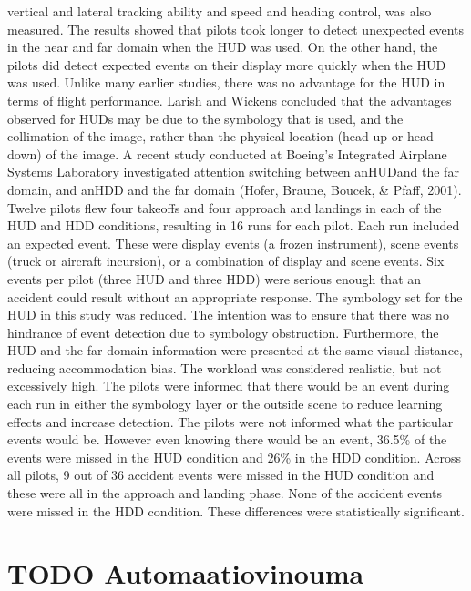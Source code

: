 \documentclass[utf8,bachelor,manualbib]{gradu3}
\begin{document}
vertical and lateral tracking ability and speed and heading control, was also measured.
The results showed that pilots took longer to detect unexpected events in the
near and far domain when the HUD was used. On the other hand, the pilots did detect
expected events on their display more quickly when the HUD was used. Unlike
many earlier studies, there was no advantage for the HUD in terms of flight
performance. Larish and Wickens concluded that the advantages observed for
HUDs may be due to the symbology that is used, and the collimation of the image,
rather than the physical location (head up or head down) of the image.
A recent study conducted at Boeing’s Integrated Airplane Systems Laboratory
investigated attention switching between anHUDand the far domain, and anHDD
and the far domain (Hofer, Braune, Boucek, \& Pfaff, 2001). Twelve pilots flew
four takeoffs and four approach and landings in each of the HUD and HDD conditions,
resulting in 16 runs for each pilot. Each run included an expected event.
These were display events (a frozen instrument), scene events (truck or aircraft incursion),
or a combination of display and scene events. Six events per pilot (three
HUD and three HDD) were serious enough that an accident could result without an
appropriate response. The symbology set for the HUD in this study was reduced.
The intention was to ensure that there was no hindrance of event detection due to
symbology obstruction. Furthermore, the HUD and the far domain information
were presented at the same visual distance, reducing accommodation bias. The
workload was considered realistic, but not excessively high. The pilots were informed
that there would be an event during each run in either the symbology layer
or the outside scene to reduce learning effects and increase detection. The pilots
were not informed what the particular events would be. However even knowing
there would be an event, 36.5\% of the events were missed in the HUD condition
and 26\% in the HDD condition. Across all pilots, 9 out of 36 accident events were
missed in the HUD condition and these were all in the approach and landing phase.
None of the accident events were missed in the HDD condition. These differences
were statistically significant. \citep{crawford2006}

\section{TODO Automaatiovinouma}
\end{document}
